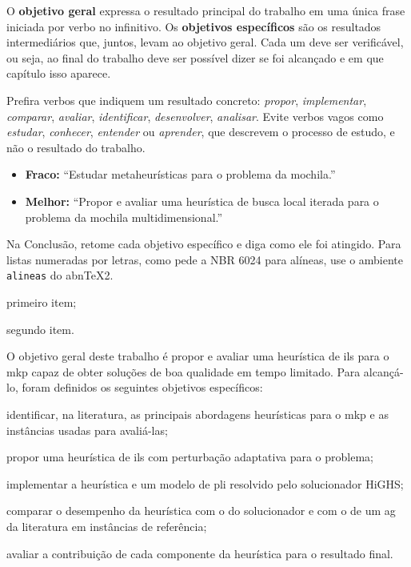 \begin{instrucao}
O \textbf{objetivo geral} expressa o resultado principal do trabalho em uma
única frase iniciada por verbo no infinitivo. Os \textbf{objetivos
específicos} são os resultados intermediários que, juntos, levam ao objetivo
geral. Cada um deve ser verificável, ou seja, ao final do trabalho deve ser
possível dizer se foi alcançado e em que capítulo isso aparece.

Prefira verbos que indiquem um resultado concreto: \emph{propor},
\emph{implementar}, \emph{comparar}, \emph{avaliar}, \emph{identificar},
\emph{desenvolver}, \emph{analisar}. Evite verbos vagos como \emph{estudar},
\emph{conhecer}, \emph{entender} ou \emph{aprender}, que descrevem o processo
de estudo, e não o resultado do trabalho.

\begin{itemize}
  \item \textbf{Fraco:} ``Estudar metaheurísticas para o problema da mochila.''
  \item \textbf{Melhor:} ``Propor e avaliar uma heurística de busca local
        iterada para o problema da mochila multidimensional.''
\end{itemize}

Na Conclusão, retome cada objetivo específico e diga como ele foi atingido.
Para listas numeradas por letras, como pede a NBR 6024 para alíneas, use o
ambiente \verb|alineas| do abnTeX2.
\begin{exemplo}
\begin{alineas}
  \item primeiro item;
  \item segundo item.
\end{alineas}
\end{exemplo}
\end{instrucao}

O objetivo geral deste trabalho é propor e avaliar uma heurística de \ac{ils}
para o \acs{mkp} capaz de obter soluções de boa qualidade em tempo limitado.
Para alcançá-lo, foram definidos os seguintes objetivos específicos:
\begin{alineas}
  \item identificar, na literatura, as principais abordagens heurísticas para
        o \acs{mkp} e as instâncias usadas para avaliá-las;
  \item propor uma heurística de \acs{ils} com perturbação adaptativa para o
        problema;
  \item implementar a heurística e um modelo de \acs{pli} resolvido pelo
        solucionador HiGHS;
  \item comparar o desempenho da heurística com o do solucionador e com o de
        um \ac{ag} da literatura em instâncias de referência;
  \item avaliar a contribuição de cada componente da heurística para o
        resultado final.
\end{alineas}

